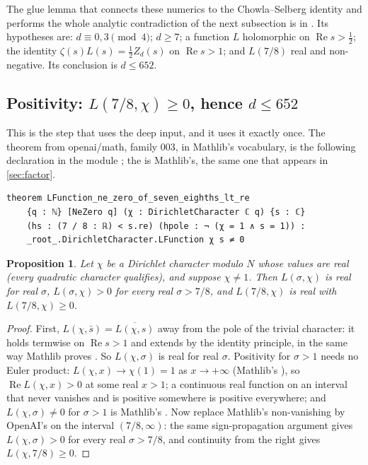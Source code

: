 \documentclass[11pt]{article}
\newtheorem{proposition}[theorem]{Proposition}
\theoremstyle{definition}
\newcommand{\re}{\operatorname{Re}}
\begin{document}
The glue lemma that connects these numerics to the Chowla--Selberg identity and performs the whole analytic contradiction of the next subsection is  in . Its hypotheses are: $d \equiv 0, 3 \pmod 4$; $d \ge 7$; a function $L$ holomorphic on $\re s > \frac12$; the identity $\zeta(s)L(s) = \frac12 Z_d(s)$ on $\re s > 1$; and $L(7/8)$ real and non-negative. Its conclusion is $d \le 652$.

\subsection{Positivity: \texorpdfstring{$L(7/8,\chi) \ge 0$}{L(7/8, chi) >= 0}, hence \texorpdfstring{$d \le 652$}{d <= 652}}\label{sec:positivity}

This is the step that uses the deep input, and it uses it exactly once. The theorem from openai/math, family 003, in Mathlib's vocabulary, is the following declaration in the module  \cite{OAImath,OAIqrh}; the  is Mathlib's, the same one that appears in \cref{sec:factor}.

\begin{lstlisting}
theorem LFunction_ne_zero_of_seven_eighths_lt_re
    {q : ℕ} [NeZero q] (χ : DirichletCharacter ℂ q) {s : ℂ}
    (hs : (7 / 8 : ℝ) < s.re) (hpole : ¬ (χ = 1 ∧ s = 1)) :
    _root_.DirichletCharacter.LFunction χ s ≠ 0
\end{lstlisting}

\begin{proposition}\label{prop:pos}
Let $\chi$ be a Dirichlet character modulo $N$ whose values are real (every quadratic character qualifies), and suppose $\chi \ne 1$. Then $L(\sigma,\chi)$ is real for real $\sigma$, $L(\sigma,\chi) > 0$ for every real $\sigma > 7/8$, and $L(7/8,\chi)$ is real with $L(7/8,\chi) \ge 0$.
\end{proposition}

\begin{proof}
First, $L(\chi,\bar s) = \overline{L(\chi,s)}$ away from the pole of the trivial character: it holds termwise on $\re s > 1$ and extends by the identity principle, in the same way Mathlib proves . So $L(\chi,\sigma)$ is real for real $\sigma$. Positivity for $\sigma > 1$ needs no Euler product: $L(\chi,x) \to \chi(1) = 1$ as $x \to +\infty$ (Mathlib's ), so $\re L(\chi,x) > 0$ at some real $x > 1$; a continuous real function on an interval that never vanishes and is positive somewhere is positive everywhere; and $L(\chi,\sigma) \ne 0$ for $\sigma > 1$ is Mathlib's . Now replace Mathlib's non-vanishing by OpenAI's on the interval $(7/8, \infty)$: the same sign-propagation argument gives $L(\chi,\sigma) > 0$ for every real $\sigma > 7/8$, and continuity from the right gives $L(\chi, 7/8) \ge 0$.
\end{proof}
\end{document}
